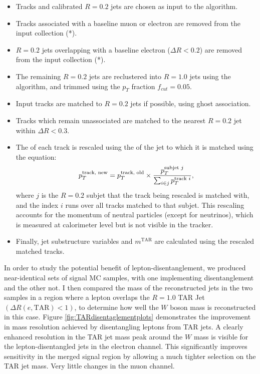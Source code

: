 \begin{itemize}
  \item Tracks and calibrated \akt $R=0.2$ jets are chosen as input to the algorithm.
  \item Tracks associated with a baseline muon or electron are removed from the input collection (*).
  \item \akt $R=0.2$ jets overlapping with a baseline electron ($\Delta R<0.2$) are removed from the input collection (*).
  \item The remaining \akt $R=0.2$ jets are reclustered into $R=1.0$ jets using the \akt algorithm, and trimmed using the $p_T$ fraction \(f_{cut}=0.05\).
  \item Input tracks are matched to $R=0.2$ jets if possible, using ghost association.
  \item Tracks which remain unassociated are matched to the nearest \akt $R=0.2$ jet within $\Delta R<0.3$.
  \item The \pT of each track is rescaled using the \pT of the jet to which it is matched using the equation:
  \begin{equation}
  p_T^{\text{track, new}} = p_T^{\text{track, old}}\times \frac{p_T^{\text{subjet $j$}}}{\sum_{i \in j} p_T^{\text{track $i$}}} ,
  \label{eq:TAR_rescale}
  \end{equation}  where $j$ is the $R=0.2$ subjet that the track being rescaled is matched with, and the index $i$ runs over all tracks matched to that subjet. This rescaling accounts for the momentum of neutral particles (except for neutrinos), which is measured at calorimeter level but is not visible in the tracker.
  \item Finally, jet substructure variables and  $m^\text{TAR}$ are calculated using the rescaled matched tracks.
\end{itemize}

In order to study the potential benefit of lepton-disentanglement, we produced near-identical sets of signal MC samples, with one implementing disentanglement and the other not.
I then compared the mass of the reconstructed jets in the two samples in a region where a lepton overlaps the $R=1.0$ TAR Jet $(\Delta R(e, \text{TAR}) < 1)$, to determine how well the $W$ boson mass is reconstructed in this case.
Figure \ref{fig:TARdisentaglementplots} demonstrates the improvement in mass resolution achieved by disentangling leptons from TAR jets. A clearly enhanced resolution in the TAR jet mass peak around the $W$ mass is visible for the lepton-disentangled jets in the electron channel. This significantly improves sensitivity in the merged signal region by allowing a much tighter selection on the TAR jet mass. Very little changes in the muon channel.

